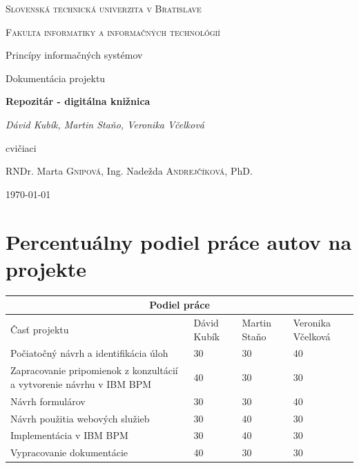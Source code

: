 \documentclass[10pt,oneside,slovak,a4paper]{article}
\begin{document}
\begin{titlepage}
	\centering
	\par\vspace{1cm}
	{\scshape\LARGE Slovenská technická univerzita v Bratislave \par}
	{\scshape\Large Fakulta informatiky a informačných technológií\par}
	\vspace{1.5cm}
	{\large Princípy informačných systémov \par}
	{\large Dokumentácia projektu\par}
	\vspace{5cm}
	{\huge\bfseries Repozitár - digitálna knižnica\par}
	\vspace{0.5cm}
	{\Large\itshape Dávid Kubík, Martin Staňo, Veronika Včelková\par}
	\vfill
	cvičiaci\par
	RNDr. Marta \textsc{Gnipová}, Ing. Nadežda \textsc{Andrejčíková}, PhD.\par
	\vspace{1cm}
	{\large \today\par}
\end{titlepage}

\tableofcontents

\newpage


\section{Percentuálny podiel práce autov na projekte}

\vspace{1cm}

\begin{tabular}{ |p{3cm}||p{2.5cm}|p{3cm}|p{2.5cm}|}
 \hline
 \multicolumn{4}{|c|}{\textbf{Podiel práce}} \\
 \hline
 Časť projektu & Dávid Kubík & Martin Staňo & Veronika Včelková\\
 \hline
 Počiatočný návrh a identifikácia úloh & 30 & 30 &  40\\
 \hline
 Zapracovanie pripomienok z konzultácií a vytvorenie návrhu v IBM BPM & 40 & 30 &  30\\
 \hline
 Návrh formulárov & 30 & 30 &  40\\
 \hline
 Návrh použitia webových služieb & 30 & 40 &  30\\
 \hline
 Implementácia v IBM BPM & 30 & 40 &  30\\
 \hline
 Vypracovanie dokumentácie & 40 & 30 &  30\\
 
 \hline
\end{tabular}
\end{document}
